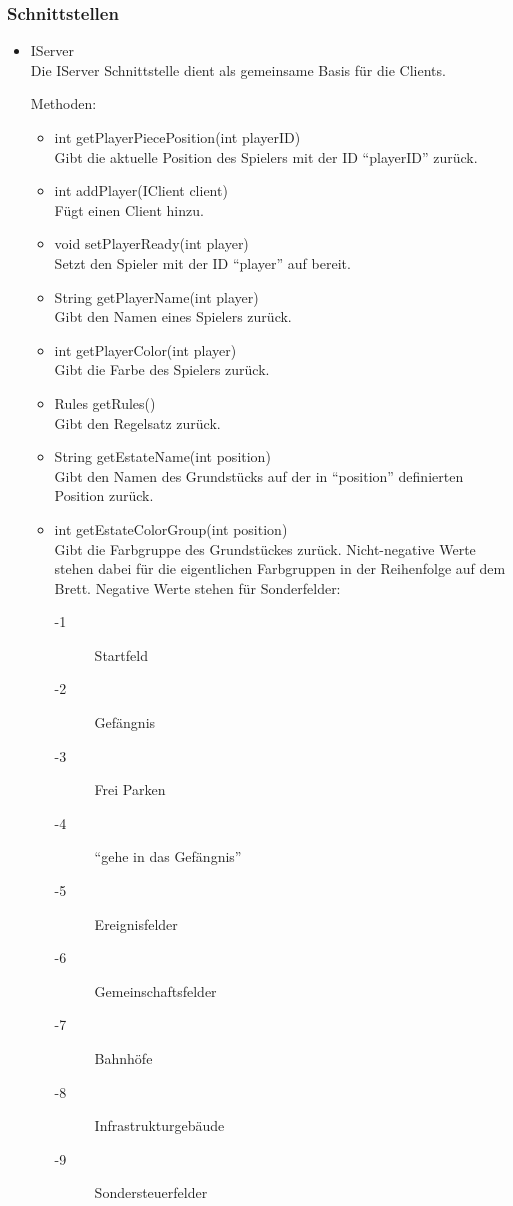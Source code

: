 \documentclass[a4paper,10pt]{article}
\begin{document}
\subsubsection{Schnittstellen}
\begin{itemize}
\item IServer \\
Die IServer Schnittstelle dient als gemeinsame Basis für die Clients.

Methoden:
\begin{itemize}
\item int getPlayerPiecePosition(int playerID) \\
Gibt die aktuelle Position des Spielers mit der ID "`playerID"' zurück.
\item int addPlayer(IClient client) \\
Fügt einen Client hinzu.
\item void setPlayerReady(int player) \\
Setzt den Spieler mit der ID "`player"' auf bereit.
\item String getPlayerName(int player) \\
Gibt den Namen eines Spielers zurück.
\item int getPlayerColor(int player) \\
Gibt die Farbe des Spielers zurück.
\item Rules getRules() \\
Gibt den Regelsatz zurück.
\item String getEstateName(int position) \\
Gibt den Namen des Grundstücks auf der in "`position"' definierten Position zurück.
\item int getEstateColorGroup(int position) \\
Gibt die Farbgruppe des Grundstückes zurück. Nicht-negative Werte stehen dabei für die eigentlichen Farbgruppen in der Reihenfolge auf dem Brett. Negative Werte stehen für Sonderfelder:
\begin{description}
\item[-1] Startfeld
\item[-2] Gefängnis
\item[-3] Frei Parken
\item[-4] "`gehe in das Gefängnis"'
\item[-5] Ereignisfelder
\item[-6] Gemeinschaftsfelder
\item[-7] Bahnhöfe
\item[-8] Infrastrukturgebäude
\item[-9] Sondersteuerfelder

\end{description}
\end{itemize}
\end{itemize}
\end{document}
